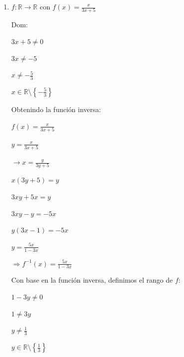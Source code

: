 \documentclass{article}
\begin{document}
\begin{enumerate}
\begin{enumerate}
        \(y \in [2, \infty)\)
        \vspace{\baselineskip}
        
        Así, la función \(f\) se define:
        
        \(f : [0, \infty) \rightarrow [2, \infty)\) dada por: \(f(x) = x^2 + 2\)
        \vspace{\baselineskip}
        
        \item[c)] \(f : \mathbb{R} \rightarrow \mathbb{R} \text{ con } f(x) = \frac{x}{3x + 5}\)

        Dom:
        
        \(3x + 5 \neq 0\)
        
        \(3x \neq -5\)
        
        \(x \neq -\frac{5}{3}\)
        
        \(x \in \mathbb{R} \setminus \left\{-\frac{5}{3}\right\}\)
        \vspace{\baselineskip}
        
        Obtenindo la función inversa:
        
        \(f(x) = \frac{x}{3x + 5}\)
        
        \(y = \frac{x}{3x + 5}\)
        \vspace{\baselineskip}
        
        \(\rightarrow x = \frac{y}{3y + 5}\)
        
        \(x(3y + 5) = y\)
        
        \(3xy + 5x = y\)
        
        \(3xy - y = -5x\)
        
        \(y(3x - 1) = -5x\)
        
        \(y = \frac{5x}{1 - 3x}\)
        \vspace{\baselineskip}
        
        \(\Rightarrow f^{-1}(x) = \frac{5x}{1 - 3x}\)
        \vspace{\baselineskip}
        
        Con base en la función inversa, definimos el rango de \(f\):
        
        \(1 - 3y \neq 0\)
        
        \(1 \neq 3y\)
        
        \(y \neq \frac{1}{3}\)
        
        \(y \in \mathbb{R} \setminus \left\{\frac{1}{3}\right\}\)
        \vspace{\baselineskip}
        

\end{enumerate}
\end{enumerate}
\end{document}
